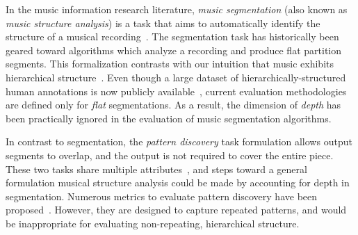 \documentclass{article}
\begin{document}
In the music information research literature, \emph{music segmentation} (also known as \emph{music structure
analysis}) is a task that aims to automatically identify the structure of a musical recording~\cite{Paulus2010}.
The segmentation task has historically been geared toward algorithms which analyze a recording and produce
flat partition segments.
This formalization contrasts with our intuition that music exhibits hierarchical
structure~\cite{Peeters2009, Smith2011}.
Even though a large dataset of hierarchically-structured human annotations is now publicly
available~\cite{Smith2011},
current evaluation methodologies are defined only for \emph{flat} segmentations.
As a result, the dimension of \emph{depth} has been practically ignored in the evaluation of music segmentation algorithms.

In contrast to segmentation, the \emph{pattern discovery} task formulation allows output segments to overlap, 
and the output is not required to cover the entire piece.
These two tasks share multiple attributes~\cite{Nieto2014_Motives}, and steps toward a 
general formulation musical structure analysis could be made by accounting for depth in segmentation.
Numerous metrics to evaluate pattern discovery have been proposed~\cite{Collins2013}.
However, they are designed to capture repeated patterns, and would be inappropriate for 
evaluating non-repeating, hierarchical structure.

\end{document}
